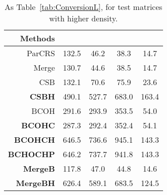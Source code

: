 \begin{table}
    \centering
    \small
    \caption{As Table~\ref{tab:ConversionL}, for test matrices with higher density.}\label{tab:ConversionH}
    \begin{tabular}{r S[table-format=3.1] S[table-format=3.1] S[table-format=3.1] S[table-format=3.1]}
        Methods &  &  &  & \\
        \midrule
        ParCRS           & 132.5 & 46.2  & 38.3  & 14.7  \\
        Merge            & 130.7 & 44.6  & 38.5  & 14.7  \\
        CSB              & 132.1 & 70.6  & 75.9  & 23.6  \\
        \textbf{CSBH}    & 490.1 & 527.7 & 683.0 & 163.4 \\
        BCOH             & 291.6 & 293.9 & 353.5 & 54.0  \\
        \textbf{BCOHC}   & 287.3 & 292.4 & 352.4 & 54.1  \\
        \textbf{BCOHCH}  & 646.5 & 736.6 & 945.1 & 143.3 \\
        \textbf{BCHOCHP} & 646.2 & 737.7 & 941.8 & 143.3 \\
        \textbf{MergeB}  & 117.8 & 47.0  & 44.8  & 14.6  \\
        \textbf{MergeBH} & 626.4 & 589.1 & 683.5 & 124.5 \\
    \end{tabular}
\end{table}